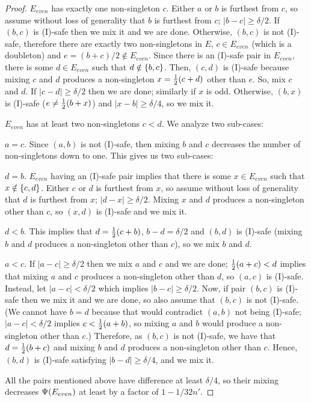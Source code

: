 \begin{proof}
	\medskip\noindent{} $E_{even}$ has exactly one non-singleton $c$.
	Either $a$ or $b$ is furthest from $c$, so assume without loss of generality 
	that $b$ is furthest from $c$; $|b-c|\geq \delta/2$.
	If $(b,c)$ is (I)-safe then we mix it and we are done.
	Otherwise, $(b,c)$ is not (I)-safe, therefore there are exactly two non-singletons in $E$,
	$c\in E_{even}$ (which is a doubleton) and $e=(b+c)/2\notin E_{even}$.
	Since there is an (I)-safe pair in $E_{even}$, there is some $d\in E_{even}$
	such that $d\notin{ \left\{ b,c \right\} }$. Then, $(c,d)$ is (I)-safe because 
	mixing $c$ and $d$ produces a non-singleton $x={\textstyle\frac{1}{2}}(c+d)$ other than $e$.
	So, mix $c$ and $d$. If $|c-d|\geq\delta/2$ then we are done; similarly if $x$ is odd.
	Otherwise, $(b,x)$ is (I)-safe ($e\neq{\textstyle\frac{1}{2}}(b+x)$) and $|x-b|\geq\delta/4$, so we mix it.
	
	\medskip\noindent{} $E_{even}$ has at least two non-singletons $c<d$.
	We analyze two sub-cases:
	\begin{description}
		\item{} $a=c$.
		Since $(a,b)$ is not (I)-safe, then mixing $b$ and $c$ decreases
		the number of non-singletons down to one. This gives us two sub-cases:
		\begin{description}
			\item{} $d=b$.
			$E_{even}$ having an (I)-safe pair implies that there is some $x\in E_{even}$ such that
			$x\notin{ \left\{ c,d \right\} }$. Either $c$ or $d$ is furthest from $x$, so			
			assume without loss of generality that $d$ is furthest from $x$; $|d-x|\geq\delta/2$.
			Mixing $x$ and $d$ produces a non-singleton other than $c$, so $(x,d)$ is (I)-safe
			and we mix it.			

			\item{} $d<b$.
			This implies that $d={\textstyle\frac{1}{2}}(c+b)$, $b-d=\delta/2$ and $(b,d)$ is (I)-safe
			(mixing $b$ and $d$ produces a non-singleton other than $c$), so we mix $b$ and $d$.
		\end{description}

		\item{} $a<c$.
		If $|a-c|\geq\delta/2$ then we mix $a$ and $c$ and we are done;
		${\textstyle\frac{1}{2}}(a+c) < d$ implies that mixing $a$ and $c$ produces a non-singleton other than $d$,
		so $(a,c)$ is (I)-safe.
		Instead, let $|a-c|<\delta/2$ which implies $|b-c|\geq\delta/2$.
		Now, if pair $(b,c)$ is (I)-safe then we mix it and we are done, 
		so also assume that $(b,c)$ is not (I)-safe.
		(We cannot have $b=d$ because that would contradict $(a,b)$ not being (I)-safe;
		$|a-c|<\delta/2$ implies $c < {\textstyle\frac{1}{2}}(a+b)$, so mixing $a$ and $b$ would produce
		a non-singleton other than $c$.)
		Therefore, as $(b,c)$ is not (I)-safe, we have that $d = {\textstyle\frac{1}{2}}(b+c)$ and mixing $b$ and $d$ 
		produces a non-singleton other than $c$. Hence, $(b,d)$ is (I)-safe
		satisfying $|b-d|\geq\delta/4$, and we mix it.
	\end{description}

	All the pairs mentioned above have difference at least $\delta/4$, so their mixing decreases 
	${\Psi}(E_{even})$	at least by a factor of $1-1/32n'$.

\end{proof}




